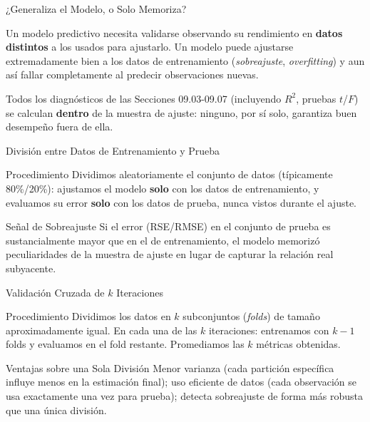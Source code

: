 \documentclass[10pt, aspectratio=169]{beamer}
\begin{document}
\begin{frame}{¿Generaliza el Modelo, o Solo Memoriza?}
  \footnotesize
  \begin{motivacion}
    Un modelo predictivo necesita validarse observando su rendimiento en \textbf{datos distintos} a los usados para ajustarlo. Un modelo puede ajustarse extremadamente bien a los datos de entrenamiento (\emph{sobreajuste}, \emph{overfitting}) y aun así fallar completamente al predecir observaciones nuevas.
  \end{motivacion}

  \vspace{0.15cm}
  \pause
  Todos los diagnósticos de las Secciones 09.03-09.07 (incluyendo $R^2$, pruebas $t$/$F$) se calculan \textbf{dentro} de la muestra de ajuste: ninguno, por sí solo, garantiza buen desempeño fuera de ella.
\end{frame}

\begin{frame}{División entre Datos de Entrenamiento y Prueba}
  \footnotesize
  \begin{block}{Procedimiento}
    Dividimos aleatoriamente el conjunto de datos (típicamente 80\%/20\%): ajustamos el modelo \textbf{solo} con los datos de entrenamiento, y evaluamos su error \textbf{solo} con los datos de prueba, nunca vistos durante el ajuste.
  \end{block}
  \pause

  \vspace{0.1cm}
  \begin{alertblock}{Señal de Sobreajuste}
    Si el error (RSE/RMSE) en el conjunto de prueba es sustancialmente mayor que en el de entrenamiento, el modelo memorizó peculiaridades de la muestra de ajuste en lugar de capturar la relación real subyacente.
  \end{alertblock}
\end{frame}

\begin{frame}{Validación Cruzada de $k$ Iteraciones}
  \footnotesize
  \begin{block}{Procedimiento}
    Dividimos los datos en $k$ subconjuntos (\emph{folds}) de tamaño aproximadamente igual. En cada una de las $k$ iteraciones: entrenamos con $k-1$ folds y evaluamos en el fold restante. Promediamos las $k$ métricas obtenidas.
  \end{block}
  \pause

  \vspace{0.1cm}
  \begin{alertblock}{Ventajas sobre una Sola División}
    Menor varianza (cada partición específica influye menos en la estimación final); uso eficiente de datos (cada observación se usa exactamente una vez para prueba); detecta sobreajuste de forma más robusta que una única división.
  \end{alertblock}
\end{frame}
\end{document}
